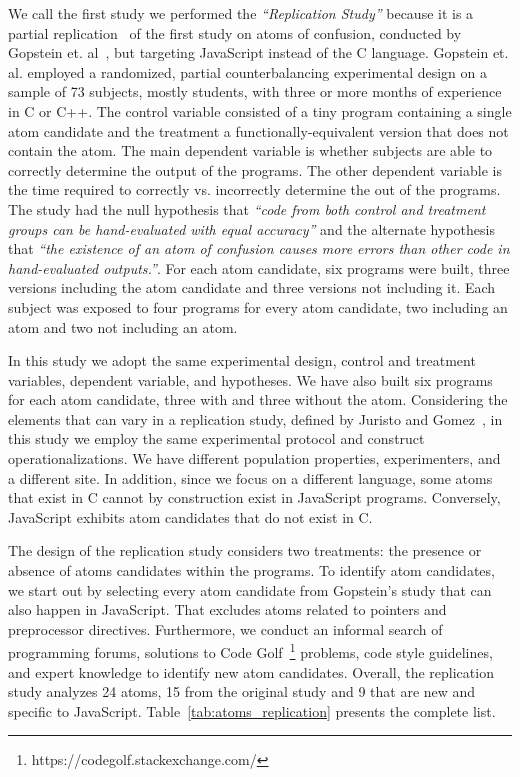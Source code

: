 We call the first study we performed the \textit{``Replication Study''} because it is a partial replication~\cite{Juristo2012} of the first study on atoms of confusion, conducted by Gopstein et. al~\cite{GopsteinIYDZYC17}, but targeting JavaScript instead of the C language. Gopstein et. al. employed a randomized, partial counterbalancing experimental design on a sample of 73 subjects, mostly students, with three or more months of experience in C or C++. The control variable consisted of a tiny program containing a single atom candidate and the treatment a functionally-equivalent version that does not contain the atom. The main dependent variable is whether subjects are able to correctly determine the output of the programs. The other dependent variable is the time required to correctly vs. incorrectly determine the out of the programs. The study had the null hypothesis that \textit{``code from both control and treatment groups can be hand-evaluated with equal accuracy''} and the alternate hypothesis that \textit{``the existence of an atom of confusion causes more errors than other code in hand-evaluated outputs.''}. For each atom candidate, six programs were built, three versions including the atom candidate and three versions not including it. Each subject was exposed to four programs for every atom candidate, two including an atom and two not including an atom.  

In this study we adopt the same experimental design, control and treatment variables, dependent variable, and hypotheses. We have also built six programs for each atom candidate, three with and three without the atom. Considering the elements that can vary in a replication study, defined by Juristo and Gomez~\cite{Juristo2012}, in this study we employ the same experimental protocol and construct operationalizations. We have different population properties, experimenters, and a different site. In addition, since we focus on a different language, some atoms that exist in C cannot by construction exist in JavaScript programs. Conversely, JavaScript exhibits atom candidates that do not exist in C. 

The design of the replication study considers two treatments: the presence or absence of atoms candidates within the programs. To identify atom candidates, we start out by selecting every atom candidate from Gopstein's study that can also happen in JavaScript. That excludes atoms related to pointers and preprocessor directives. Furthermore, we conduct an informal search of programming forums, solutions to Code Golf~\footnote{https://codegolf.stackexchange.com/} problems, code style guidelines, and expert knowledge to identify new atom candidates. Overall, the replication study analyzes 24 atoms, 15 from the original study and 9 that are new and specific to JavaScript. Table~\ref{tab:atoms_replication} presents the complete list. 

